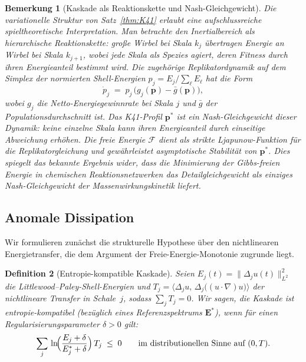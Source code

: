 \documentclass[12pt,a4paper]{article}
\theoremstyle{breakdef}
\newtheorem{definition}{Definition}[section]
\theoremstyle{breakplain}
\theoremstyle{breakdef}
\newtheorem{remark}[definition]{Bemerkung}
\begin{document}
\begin{remark}[Kaskade als Reaktionskette und Nash-Gleichgewicht]\label{rem:nash}
Die variationelle Struktur von Satz~\ref{thm:K41} erlaubt eine aufschlussreiche
spieltheoretische Interpretation. Man betrachte den Inertialbereich als
hierarchische \emph{Reaktionskette}: große Wirbel bei Skala $k_j$ übertragen
Energie an Wirbel bei Skala $k_{j+1}$, wobei jede Skala als \glqq Spezies\grqq{} agiert,
deren Fitness durch ihren Energieanteil bestimmt wird. Die zugehörige
Replikatordynamik auf dem Simplex der normierten Shell-Energien
$p_j = E_j / \sum_\ell E_\ell$ hat die Form
\[
  \dot{p}_j
  \;=\;
  p_j\,\bigl(g_j(\mathbf{p}) - \bar{g}(\mathbf{p})\bigr),
\]
wobei $g_j$ die Netto-Energiegewinnrate bei Skala $j$ und $\bar{g}$ der
Populationsdurchschnitt ist. Das K41-Profil $\mathbf{p}^*$ ist ein
\emph{Nash-Gleichgewicht} dieser Dynamik: keine einzelne Skala kann ihren
Energieanteil durch einseitige Abweichung erhöhen. Die freie Energie
$\mathcal{F}$ dient als strikte Ljapunow-Funktion für die
Replikatorgleichung und gewährleistet asymptotische Stabilität von
$\mathbf{p}^*$.
Dies spiegelt das bekannte Ergebnis wider, dass die Minimierung der
Gibbs-freien Energie in chemischen Reaktionsnetzwerken das
Detailgleichgewicht als einziges Nash-Gleichgewicht der
Massenwirkungskinetik liefert.
\end{remark}

\subsection{Anomale Dissipation}

Wir formulieren zunächst die strukturelle Hypothese über den nichtlinearen
Energietransfer, die dem Argument der Freie-Energie-Monotonie zugrunde liegt.

\begin{definition}[Entropie-kompatible Kaskade]\label{def:NL}
Seien $E_j(t) = \|\Delta_j u(t)\|_{L^2}^2$ die Littlewood--Paley-Shell-Energien
und $T_j = \langle \Delta_j u,\, \Delta_j\bigl((u\cdot\nabla)u\bigr)\rangle$
der nichtlineare Transfer in Schale~$j$, sodass $\sum_j T_j = 0$.
Wir sagen, die Kaskade ist \emph{entropie-kompatibel} (bezüglich eines
Referenzspektrums $\mathbf{E}^*$), wenn für einen
Regularisierungsparameter $\delta > 0$ gilt:
\begin{equation}\label{eq:NL}
  \sum_{j}\,\ln\!\Bigl(\frac{E_j + \delta}{E_j^* + \delta}\Bigr)\,T_j
  \;\le\; 0
  \qquad \text{im distributionellen Sinne auf } (0,T).
\end{equation}
\end{definition}
\end{document}
